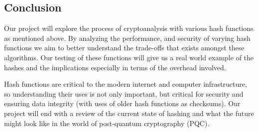 \documentclass[12pt,english]{article}
\begin{document}
\subsection*{Conclusion}
Our project will explore the process of cryptoanalysis with various 
hash functions as mentioned above. By analyzing the performance, 
and security of varying hash functions we aim to 
better understand the trade-offs that exists amongst 
these algorithms. Our testing of these functions will 
give us a real world example of the hashes and the implications especially 
in terms of the overhead involved.

Hash functions are critical to the modern internet 
and computer infrastructure, so understanding their uses 
is not only important, but critical for security and ensuring 
data integrity (with uses of older hash functions as checksums). Our project will end with a review of the current state of hashing and what the future might look like in the world of post-quantum cryptography (PQC).
\end{document}

